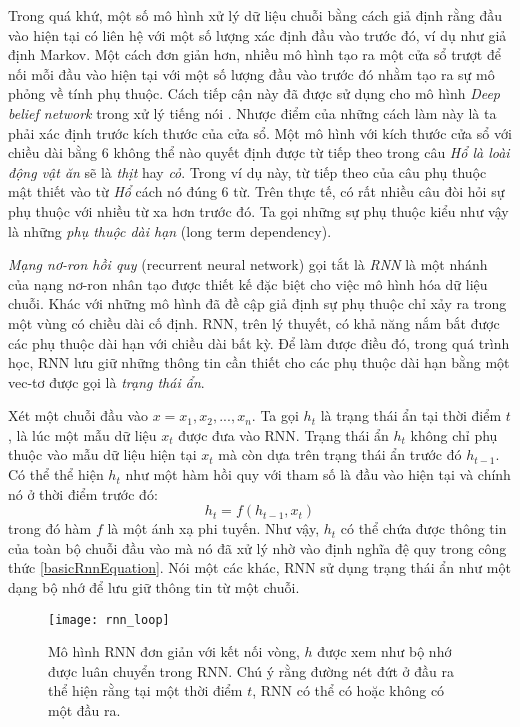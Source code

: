 Trong quá khứ, một số mô hình xử lý dữ liệu chuỗi bằng cách giả định rằng đầu vào hiện tại có liên hệ với một số lượng xác định đầu vào trước đó, ví dụ như giả định Markov. Một cách đơn giản hơn, nhiều mô hình tạo ra một cửa sổ trượt để nối mỗi đầu vào hiện tại với một số lượng đầu vào trước đó nhằm tạo ra sự mô phỏng về tính phụ thuộc. Cách tiếp cận này đã được sử dụng cho mô hình \textit{Deep belief network} trong xử lý tiếng nói \cite{massetal2012}. Nhược điểm của những cách làm này là ta phải xác định trước kích thước của cửa sổ. Một mô hình với kích thước cửa sổ với chiều dài bằng 6 không thể nào quyết định được từ tiếp theo trong câu \textit{Hổ là loài động vật ăn} sẽ là \textit{thịt} hay \textit{cỏ}. Trong ví dụ này, từ tiếp theo của câu phụ thuộc mật thiết vào từ \textit{Hổ} cách nó đúng 6 từ. Trên thực tế, có rất nhiều câu đòi hỏi sự phụ thuộc với nhiều từ xa hơn trước đó. Ta gọi những sự phụ thuộc kiểu như vậy là những \textit{phụ thuộc dài hạn} (long term dependency). 

\textit{Mạng nơ-ron hồi quy} (recurrent neural network) \cite{elman1990} gọi tắt là \textit{RNN} là một nhánh của nạng nơ-ron nhân tạo được thiết kế đặc biệt cho việc mô hình hóa dữ liệu chuỗi. Khác với những mô hình đã đề cập giả định sự phụ thuộc chỉ xảy ra trong một vùng có chiều dài cố định. RNN, trên lý thuyết, có khả năng nắm bắt được các phụ thuộc dài hạn với chiều dài bất kỳ. Để làm được điều đó, trong quá trình học, RNN lưu giữ những thông tin cần thiết cho các phụ thuộc dài hạn bằng một vec-tơ được gọi là \textit{trạng thái ẩn}.

Xét một chuỗi đầu vào $x={x_1,x_2,...,x_n}$. Ta gọi $h_t$ là trạng thái ẩn tại thời điểm $t$, là lúc một mẫu dữ liệu $x_t$ được đưa vào RNN. Trạng thái ẩn $h_t$ không chỉ phụ thuộc vào mẫu dữ liệu hiện tại $x_t$ mà còn dựa trên trạng thái ẩn trước đó $h_{t-1}$. Có thể thể hiện $h_t$ như một hàm hồi quy với tham số là đầu vào hiện tại và chính nó ở thời điểm trước đó:
\begin{equation} \label{basicRnnEquation}
	h_t = f \left(h_{t-1}, x_t \right)
\end{equation}
trong đó hàm $f$ là một ánh xạ phi tuyến. Như vậy, $h_t$ có thể chứa được thông tin của toàn bộ chuỗi đầu vào mà nó đã xử lý nhờ vào định nghĩa đệ quy trong công thức \ref{basicRnnEquation}. Nói một các khác, RNN sử dụng trạng thái ẩn như một dạng bộ nhớ để lưu giữ thông tin từ một chuỗi.

\begin{figure}
	\centering
	\texttt{[image: rnn\_loop]}
	\caption[Mô hình RNN dạng đệ quy]{Mô hình RNN đơn giản với kết nối vòng, \textbf{$h$} được xem như bộ nhớ được luân chuyển trong RNN. Chú ý rằng đường nét đứt ở đầu ra thể hiện rằng tại một thời điểm $t$, RNN có thể có hoặc không có một đầu ra.}
	\label{fig_rnn_loop}
\end{figure}

